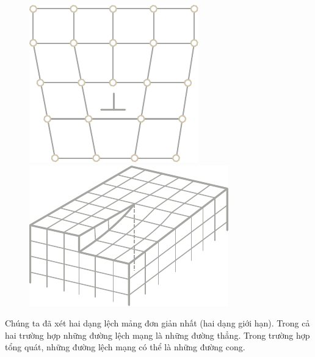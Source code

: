 \begin{figure}[!htb]
	\begin{minipage}[t]{0.5\linewidth}
		\begin{center}
			\includegraphics[scale=1.0]{figures/ch_13/fig_13_8.pdf}
			\caption[]{}
			\label{fig:13_8}
		\end{center}
	\end{minipage}
	\hspace{-0.05cm}
	\begin{minipage}[t]{0.5\linewidth}
		\begin{center}
			\includegraphics[scale=1.0]{figures/ch_13/fig_13_9.pdf}
			\caption[]{}
			\label{fig:13_9}
		\end{center}
	\end{minipage}
	\vspace{-0.4cm}
\end{figure}


Chúng ta đã xét hai dạng lệch mảng đơn giản nhất (hai dạng giới hạn). Trong cả hai trường hợp những đường lệch mạng là những đường thẳng. Trong trường hợp tổng quát, những đường lệch mạng có thể là những đường cong.

